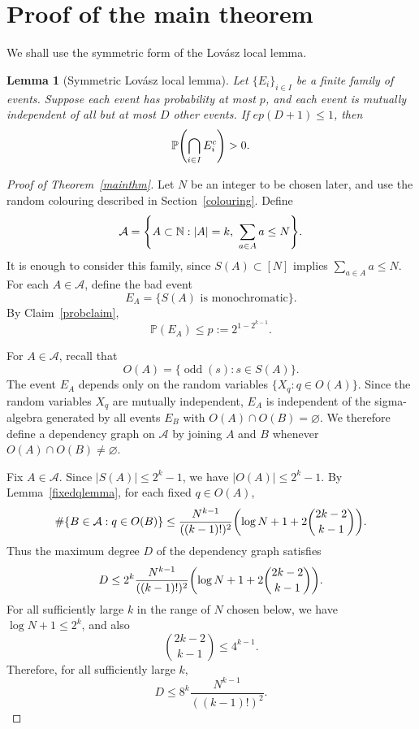 \documentclass[12pt,a4paper,english,reqno]{amsart}
\theoremstyle{plain}
\newtheorem{lemma}[theorem]{Lemma}
\theoremstyle{remark}
\DeclareMathOperator{\odd}{odd}
\newcommand{\A}{\mathcal{A}}
\newcommand{\N}{\mathbb{N}}
\let\emptyset\varnothing
\let\originalleft\left
\let\originalright\right
\renewcommand{\left}{\mathopen{}\mathclose\bgroup\originalleft}
\renewcommand{\right}{\aftergroup\egroup\originalright}
\begin{document}
\section{Proof of the main theorem}\label{pf}

We shall use the symmetric form of the Lov\'{a}sz local lemma.

\begin{lemma}[Symmetric Lov\'{a}sz local lemma]\label{lll}
Let $\{E_i\}_{i\in I}$ be a finite family of events. Suppose each event has probability at most $p$, and each event is mutually independent of all but at most $D$ other events. If $ep(D+1)\le1$, then
\[
\mathbb P\left(\bigcap_{i\in I}E_i^c\right)>0.
\]
\end{lemma}

\begin{proof}[Proof of Theorem~\ref{mainthm}]
Let $N$ be an integer to be chosen later, and use the random colouring described in Section~\ref{colouring}. Define
\[
\A=\left\{A\subset\N: |A|=k,\ \sum_{a\in A}a\le N\right\}.
\]
It is enough to consider this family, since $S(A)\subset[N]$ implies $\sum_{a\in A}a\le N$. For each $A\in\A$, define the bad event
\[
E_A=\{S(A)\text{ is monochromatic}\}.
\]
By Claim~\ref{probclaim},
\begin{equation}\label{pbound}
\mathbb P(E_A)\le p:=2^{1-2^{k-1}}.
\end{equation}

For $A\in\A$, recall that
\[
O(A)=\{\odd(s):s\in S(A)\}.
\]
The event $E_A$ depends only on the random variables $\{X_q:q\in O(A)\}$. Since the random variables $X_q$ are mutually independent, $E_A$ is independent of the sigma-algebra generated by all events $E_B$ with $O(A)\cap O(B)=\emptyset$. We therefore define a dependency graph on $\A$ by joining $A$ and $B$ whenever $O(A)\cap O(B)\ne\emptyset$.

Fix $A\in\A$. Since $|S(A)|\le 2^k-1$, we have $|O(A)|\le2^k-1$. By Lemma~\ref{fixedqlemma}, for each fixed $q\in O(A)$,
\[
\#\{B\in\A:q\in O(B)\}
\le
\frac{N^{k-1}}{((k-1)!)^2}
\left(\log N+1+2\binom{2k-2}{k-1}\right).
\]
Thus the maximum degree $D$ of the dependency graph satisfies
\begin{equation}\label{degreebound}
D
\le
2^k
\frac{N^{k-1}}{((k-1)!)^2}
\left(\log N+1+2\binom{2k-2}{k-1}\right).
\end{equation}
For all sufficiently large $k$ in the range of $N$ chosen below, we have $\log N+1\le2^k$, and also
\[
\binom{2k-2}{k-1}\le4^{k-1}.
\]
Therefore, for all sufficiently large $k$,
\begin{equation}\label{degreebound2}
D\le 8^k\frac{N^{k-1}}{((k-1)!)^2}.
\end{equation}


\end{proof}
\end{document}

